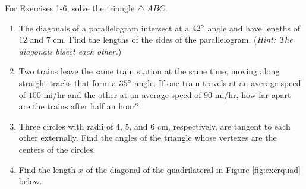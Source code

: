{\small
\par\noindent For Exercises 1-6, solve the triangle $\triangle\,ABC$.
\begin{enumerate}[\bfseries 1.]
 \item The diagonals of a parallelogram intersect at a $42^\circ$ angle and have lengths
 of $12$ and $7$ cm. Find the lengths of the sides of the parallelogram. (\emph{Hint: The
 diagonals bisect each other.})
 \item Two trains leave the same train station at the same time, moving along straight tracks that
 form a $35^\circ$ angle. If one train travels at an average speed of $100$ mi/hr and the other
 at an average speed of $90$ mi/hr, how far apart are the trains after half an hour?
 \item Three circles with radii of $4$, $5$, and $6$ cm, respectively, are tangent to each
 other externally. Find the angles of the triangle whose vertexes are the centers of the circles.
 \item\label{exer:quad} Find the length $x$ of the diagonal of the quadrilateral in Figure
  \ref{fig:exerquad} below.
\begin{figure}[h]
\begin{minipage}[t]{7.5cm}
 \begin{center}
  \vspace{-5mm}

\end{center}
\end{minipage}
\end{figure}
\end{enumerate}}
